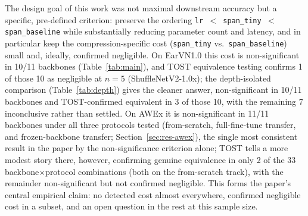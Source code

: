\documentclass[pdflatex,sn-vancouver-num]{sn-jnl}
\begin{document}
The design goal of this work was not maximal downstream accuracy but a specific, pre-defined criterion: preserve the ordering \texttt{lr $<$ span\_tiny $<$ span\_baseline} while substantially reducing parameter count and latency, and in particular keep the compression-specific cost (\texttt{span\_tiny} vs.\ \texttt{span\_baseline}) small and, ideally, confirmed negligible. On EarVN1.0 this cost is non-significant in 10/11 backbones (Table~\ref{tab:main}), and TOST equivalence testing confirms 1 of those 10 as negligible at $n=5$ (ShuffleNetV2-1.0x); the depth-isolated comparison (Table~\ref{tab:depth}) gives the cleaner answer, non-significant in 10/11 backbones and TOST-confirmed equivalent in 3 of those 10, with the remaining 7 inconclusive rather than settled. On AWEx it is non-significant in 11/11 backbones under all three protocols tested (from-scratch, full-fine-tune transfer, and frozen-backbone transfer; Section~\ref{sec:res-awex}), the single most consistent result in the paper by the non-significance criterion alone; TOST tells a more modest story there, however, confirming genuine equivalence in only 2 of the 33 backbone$\times$protocol combinations (both on the from-scratch track), with the remainder non-significant but not confirmed negligible. This forms the paper's central empirical claim: no detected cost almost everywhere, confirmed negligible cost in a subset, and an open question in the rest at this sample size.
\end{document}
